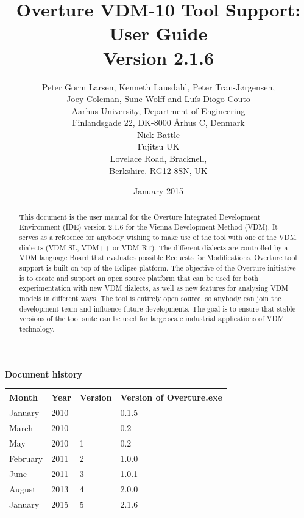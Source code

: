 \documentclass{overturerepchap}
\begin{document}
\title{Overture VDM-10 Tool Support: User Guide \\{\large Version 2.1.6}}
\author{Peter Gorm Larsen, Kenneth Lausdahl, Peter Tran-J\o{}rgensen,\\ Joey Coleman, Sune Wolff and  Lu\'{i}s Diogo Couto \\
Aarhus University, Department of Engineering\\
Finlandsgade 22, DK-8000 \AA{}rhus C, Denmark\\[3mm]
Nick Battle\\
Fujitsu UK\\
Lovelace Road, Bracknell, \\
Berkshire. RG12 8SN, UK}

\date{January 2015}


\maketitle


\textbf{Document history}

\begin{tabular}{|l|l|l|l|}\hline
Month   & Year & Version & Version of Overture.exe \\ \hline
January & 2010 &         & 0.1.5 \\ \hline
March   & 2010 &         & 0.2   \\ \hline
May     & 2010 & 1       & 0.2   \\ \hline
February& 2011 & 2       & 1.0.0   \\ \hline
June    & 2011 & 3       & 1.0.1   \\ \hline
August  & 2013 & 4       & 2.0.0 \\ \hline
January  & 2015 & 5       & 2.1.6 \\ \hline
\end{tabular}

\tableofcontents

\begin{abstract}
This document is the user manual for the Overture Integrated Development
Environment (IDE) version 2.1.6 for the Vienna Development Method
(VDM). It serves as a reference for anybody wishing to make use of
the tool with one of the VDM dialects (VDM-SL, VDM++ or VDM-RT). 
The different dialects are controlled by a VDM language Board that 
evaluates possible Requests for Modifications.
Overture tool support is built on top of the Eclipse platform. The
objective of the Overture initiative is to create and support an open source
platform that can be used for both experimentation with new VDM dialects,
as well as new features for analysing VDM
models in different ways. The tool is entirely open source, so anybody
can join the development team and influence future
developments. The goal is to ensure that stable
versions of the tool suite can be used for large scale industrial
applications of VDM technology.
\end{abstract}
\end{document}

